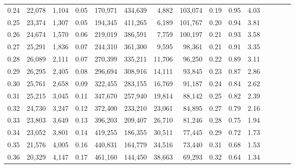 \begin{tabular}{rrrcrrrrrrrrrrr}
0.24 &  22,078 &  1,104 &                                       0.05 &  170,971 &  434,639 &    4,882 &  103,074 &  0.19 &  0.95 &                         4.03 \\
0.25 &  23,374 &  1,307 &                                       0.05 &  194,345 &  411,265 &    6,189 &  101,767 &  0.20 &  0.94 &                         3.81 \\
0.26 &  24,674 &  1,570 &                                       0.06 &  219,019 &  386,591 &    7,759 &  100,197 &  0.21 &  0.93 &                         3.58 \\
0.27 &  25,291 &  1,836 &                                       0.07 &  244,310 &  361,300 &    9,595 &   98,361 &  0.21 &  0.91 &                         3.35 \\
0.28 &  26,089 &  2,111 &                                       0.07 &  270,399 &  335,211 &   11,706 &   96,250 &  0.22 &  0.89 &                         3.11 \\
0.29 &  26,295 &  2,405 &                                       0.08 &  296,694 &  308,916 &   14,111 &   93,845 &  0.23 &  0.87 &                         2.86 \\
0.30 &  25,761 &  2,658 &                                       0.09 &  322,455 &  283,155 &   16,769 &   91,187 &  0.24 &  0.84 &                         2.62 \\
0.31 &  25,215 &  3,045 &                                       0.11 &  347,670 &  257,940 &   19,814 &   88,142 &  0.25 &  0.82 &                         2.39 \\
0.32 &  24,730 &  3,247 &                                       0.12 &  372,400 &  233,210 &   23,061 &   84,895 &  0.27 &  0.79 &                         2.16 \\
0.33 &  23,803 &  3,649 &                                       0.13 &  396,203 &  209,407 &   26,710 &   81,246 &  0.28 &  0.75 &                         1.94 \\
0.34 &  23,052 &  3,801 &                                       0.14 &  419,255 &  186,355 &   30,511 &   77,445 &  0.29 &  0.72 &                         1.73 \\
0.35 &  21,576 &  4,005 &                                       0.16 &  440,831 &  164,779 &   34,516 &   73,440 &  0.31 &  0.68 &                         1.53 \\
0.36 &  20,329 &  4,147 &                                       0.17 &  461,160 &  144,450 &   38,663 &   69,293 &  0.32 &  0.64 &                         1.34 \\

\end{tabular}
